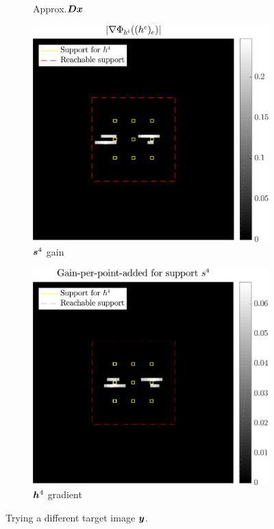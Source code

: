 \begin{figure}[!ht]
\begin{subfigure}[b]{0.22\textwidth}
	\caption{Approx.\@ $\bm{D}\bm{x}$}
	\end{subfigure}
	\begin{subfigure}[b]{0.26\textwidth}\centering
	\includegraphics[width=\textwidth]{figures/xp/tilted_n4/xp_128x128_sc2_angl4_K3_S3_node4_partgrad4_bestvalues.pdf}
	\caption{$\bm{s}^4$ gain}
	\end{subfigure}
	\begin{subfigure}[b]{0.26\textwidth}\centering
	\includegraphics[width=\textwidth]{figures/xp/tilted_n4/xp_128x128_sc2_angl4_K3_S3_node4_objmatrix_bestvalues.pdf}
	\caption{$\bm{h}^4$ gradient}
	\end{subfigure}
\caption{Trying a different target image $\bm{y}$.}\label{fig_gain_tilted_n4}
\end{figure}

